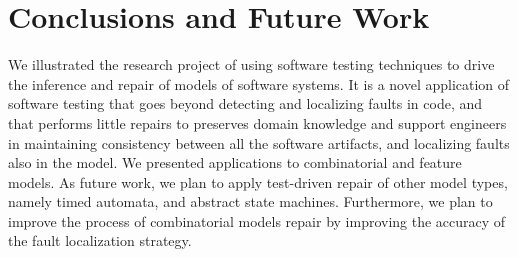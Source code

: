 \documentclass[
11pt, %
oneside, %
english, %
singlespacing, %
headsepline, %
]{MastersDoctoralThesis} %
\theoremstyle{plain}
\theoremstyle{definition}
\theoremstyle{remark}
\theoremstyle{remark}
\theoremstyle{plain}
\theoremstyle{plain}
\begin{document}
\chapter{Conclusions and Future Work}
We illustrated the research project of using software testing techniques to drive the inference and repair of models of software systems.
It is a novel application of software testing that goes beyond detecting and localizing faults in code, and that performs little repairs to preserves domain knowledge and support engineers in maintaining consistency between all the software artifacts, and localizing faults also in the model. 
We presented applications to combinatorial and feature models. As future work, we plan to apply test-driven repair of other model types, namely timed automata, and abstract state machines. Furthermore, we plan to improve the process of combinatorial models repair by improving the accuracy of the fault localization strategy.%



 




%
%
%


\printbibliography[heading=bibintoc]

\end{document}
